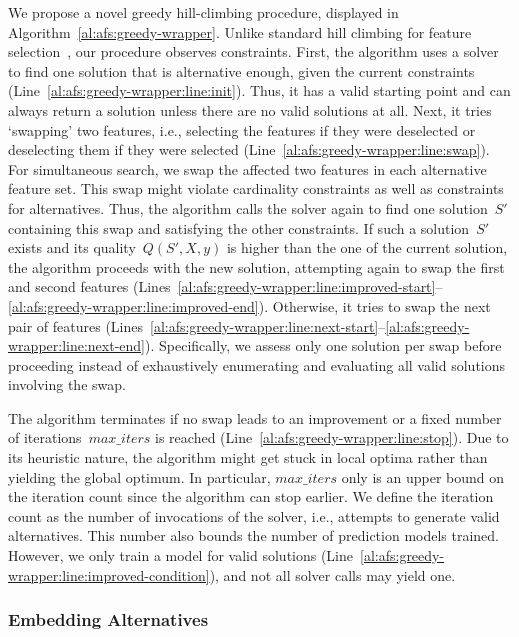 \documentclass[iicol, sn-basic, Numbered]{sn-jnl} %
\theoremstyle{plain}
\theoremstyle{definition}
\begin{document}
We propose a novel greedy hill-climbing procedure, displayed in Algorithm~\ref{al:afs:greedy-wrapper}.
Unlike standard hill climbing for feature selection~\cite{kohavi1997wrappers}, our procedure observes constraints.
First, the algorithm uses a solver to find one solution that is alternative enough, given the current constraints (Line~\ref{al:afs:greedy-wrapper:line:init}).
Thus, it has a valid starting point and can always return a solution unless there are no valid solutions at all.
Next, it tries `swapping' two features, i.e., selecting the features if they were deselected or deselecting them if they were selected (Line~\ref{al:afs:greedy-wrapper:line:swap}).
For simultaneous search, we swap the affected two features in each alternative feature set.
This swap might violate cardinality constraints as well as constraints for alternatives.
Thus, the algorithm calls the solver again to find one solution~$S'$ containing this swap and satisfying the other constraints.
If such a solution~$S'$ exists and its quality~$Q(S',X,y)$ is higher than the one of the current solution, the algorithm proceeds with the new solution, attempting again to swap the first and second features (Lines~\ref{al:afs:greedy-wrapper:line:improved-start}--\ref{al:afs:greedy-wrapper:line:improved-end}).
Otherwise, it tries to swap the next pair of features (Lines~\ref{al:afs:greedy-wrapper:line:next-start}--\ref{al:afs:greedy-wrapper:line:next-end}).
Specifically, we assess only one solution per swap before proceeding instead of exhaustively enumerating and evaluating all valid solutions involving the swap.

The algorithm terminates if no swap leads to an improvement or a fixed number of iterations~$max\_iters$ is reached (Line~\ref{al:afs:greedy-wrapper:line:stop}).
Due to its heuristic nature, the algorithm might get stuck in local optima rather than yielding the global optimum.
In particular, $max\_iters$ only is an upper bound on the iteration count since the algorithm can stop earlier.
We define the iteration count as the number of invocations of the solver, i.e., attempts to generate valid alternatives.
This number also bounds the number of prediction models trained.
However, we only train a model for valid solutions (Line~\ref{al:afs:greedy-wrapper:line:improved-condition}), and not all solver calls may yield one.

\subsubsection{Embedding Alternatives}
\label{sec:afs:approach:objectives:embedding}
\end{document}

